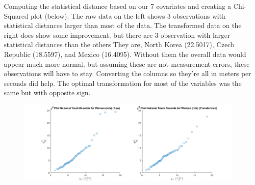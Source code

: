 Computing the statistical distance based on our 7 covariates and creating a Chi-Squared plot (below). The raw data on the left shows 3 observations with statistical distances larger than most of the data. The transformed data on the right does show some improvement, but there are 3 observation with larger statistical distances than the others They are, North Korea (22.5017), Czech Republic (18.5597), and Mexico (16.4095). Without them the overall data would appear much more normal, but assuming these are not measurement errors, these observations will have to stay. Converting the columns so they're all in meters per seconds did help. The optimal transformation for most of the variables was the same but with opposite sign.

\begin{center}
    \begin{figure}[H]
        \centering
        \includegraphics[scale=0.4]{./matlab/chapter-4/sol4.37.chi2.png}
    \end{figure}
\end{center}

